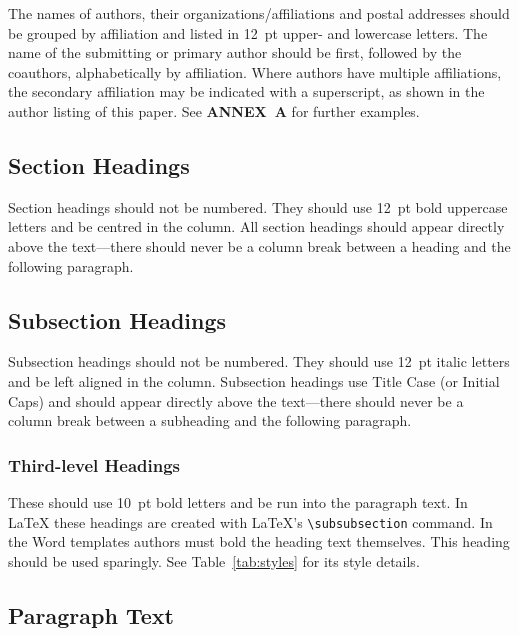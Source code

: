 \documentclass[a4paper,
               keeplastbox,   %
               ]{jacow}
\begin{document}
The names of authors, their organizations/affiliations and
postal addresses should be grouped by affiliation and
listed in \SI{12}{pt} upper- and lowercase letters. The name of
the submitting or primary author should be first, followed
by the coauthors, alphabetically by affiliation. Where
authors have multiple affiliations, the secondary affiliation
may be indicated with a superscript, as shown in the
author listing of this paper. See \textbf{ANNEX~A} for further examples.

\subsection{Section Headings}

Section headings should not be numbered. They should
use  \SI{12}{pt}  bold  uppercase  letters  and  be  centred  in  the
column. All section headings should appear directly above
the text---there should never be a column break between a heading and the
following paragraph.

\subsection{Subsection Headings}

Subsection  headings  should  not  be  numbered.
They should use \SI{12}{pt} italic letters and be left aligned in the column.
Subsection headings use Title Case (or Initial Caps)
and should appear directly above the text---there should never be a column break
between a subheading and the following paragraph.

\subsubsection{Third-level Headings} These should use \SI{10}{pt} bold
letters and be run into the paragraph text. In \LaTeX{} these headings are
created with \LaTeX's \verb|\subsubsection| command.
In the Word templates authors must bold the heading text themselves.
This heading should be used sparingly. See Table~\ref{tab:styles}
for its style details.

\subsection{Paragraph Text}
\end{document}
